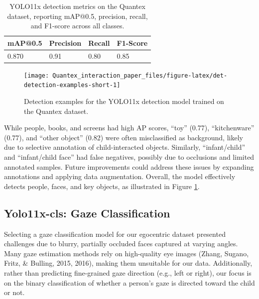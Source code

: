 \documentclass[
  man,floatsintext]{apa6}
\begin{document}
\begin{table}[tbp]

\begin{center}
\begin{threeparttable}

\caption{\label{tab:det-metrics-short}YOLO11x detection metrics on the Quantex dataset, reporting mAP@0.5, precision, recall, and F1-score across all classes.}

\begin{tabular}{llll}
\toprule
mAP@0.5 & \multicolumn{1}{c}{Precision} & \multicolumn{1}{c}{Recall} & \multicolumn{1}{c}{F1-Score}\\
\midrule
0.870 & 0.91 & 0.80 & 0.85\\
\bottomrule
\end{tabular}

\end{threeparttable}
\end{center}

\end{table}

\begin{figure}

{\centering \texttt{[image: Quantex\_interaction\_paper\_files/figure-latex/det-detection-examples-short-1]} 

}

\caption{Detection examples for the YOLO11x detection model trained on the Quantex dataset.}\label{fig:det-detection-examples-short}
\end{figure}

While people, books, and screens had high AP scores, ``toy'' (0.77), ``kitchenware'' (0.77), and ``other object'' (0.82) were often misclassified as background, likely due to selective annotation of child-interacted objects. Similarly, ``infant/child'' and ``infant/child face'' had false negatives, possibly due to occlusions and limited annotated samples. Future improvements could address these issues by expanding annotations and applying data augmentation. Overall, the model effectively detects people, faces, and key objects, as illustrated in Figure \ref{fig:det-detection-examples-short}.

\subsection{Yolo11x-cls: Gaze Classification}\label{yolo11x-cls}

Selecting a gaze classification model for our egocentric dataset presented challenges due to blurry, partially occluded faces captured at varying angles. Many gaze estimation methods rely on high-quality eye images (Zhang, Sugano, Fritz, \& Bulling, 2015, 2016), making them unsuitable for our data. Additionally, rather than predicting fine-grained gaze direction (e.g., left or right), our focus is on the binary classification of whether a person's gaze is directed toward the child or not.
\end{document}
